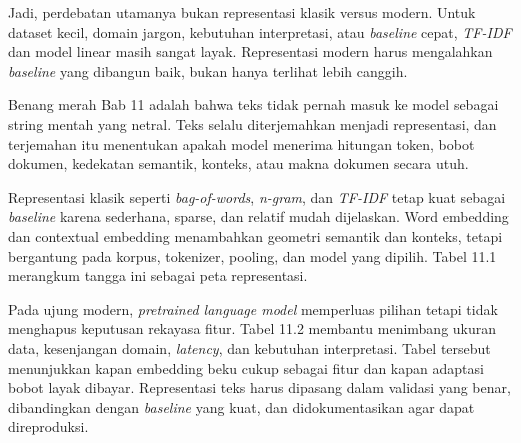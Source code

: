 Jadi, perdebatan utamanya bukan representasi klasik versus modern. Untuk dataset kecil, domain jargon, kebutuhan interpretasi, atau \emph{baseline} cepat, \emph{TF-IDF} dan model linear masih sangat layak. Representasi modern harus mengalahkan \emph{baseline} yang dibangun baik, bukan hanya terlihat lebih canggih.

\begin{sintesis}

Benang merah Bab 11 adalah bahwa teks tidak pernah masuk ke model sebagai string mentah yang netral. Teks selalu diterjemahkan menjadi representasi, dan terjemahan itu menentukan apakah model menerima hitungan token, bobot dokumen, kedekatan semantik, konteks, atau makna dokumen secara utuh.

Representasi klasik seperti \emph{bag-of-words}, \emph{n-gram}, dan \emph{TF-IDF} tetap kuat sebagai \emph{baseline} karena sederhana, sparse, dan relatif mudah dijelaskan. Word embedding dan contextual embedding menambahkan geometri semantik dan konteks, tetapi bergantung pada korpus, tokenizer, pooling, dan model yang dipilih. Tabel 11.1 merangkum tangga ini sebagai peta representasi.

Pada ujung modern, \emph{pretrained language model} memperluas pilihan tetapi tidak menghapus keputusan rekayasa fitur. Tabel 11.2 membantu menimbang ukuran data, kesenjangan domain, \emph{latency}, dan kebutuhan interpretasi. Tabel tersebut menunjukkan kapan embedding beku cukup sebagai fitur dan kapan adaptasi bobot layak dibayar. Representasi teks harus dipasang dalam validasi yang benar, dibandingkan dengan \emph{baseline} yang kuat, dan didokumentasikan agar dapat direproduksi.

\end{sintesis}

